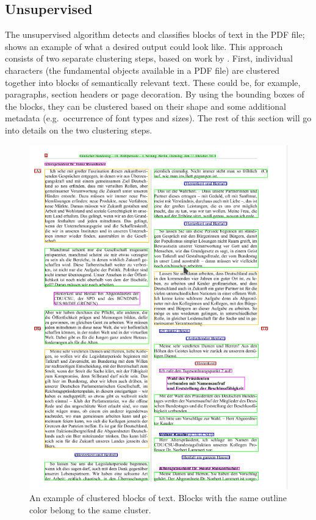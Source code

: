 \subsection{Unsupervised}%
\label{sec:unsup}
The unsupervised algorithm detects and classifies blocks of text in the PDF
file;  shows an example of what a desired output could
look like. This approach consists of two separate clustering steps, based on
work by \textcite{klampfl2014unsupervised}. First, individual characters (the
fundamental objects available in a PDF file) are clustered together into
blocks of semantically relevant text. These could be, for example,
paragraphs, section headers or page decoration. By using the bounding boxes of
the blocks, they can be clustered based on their shape and some additional
metadata (e.g.\ occurrence of font types and sizes). The rest of this section
will go into details on the two clustering steps.

\begin{figure}[tb]
  \centering
  \includegraphics[height=0.5\textheight]{figures/cluster_example.png}
  \caption{An example of clustered blocks of text. Blocks with the same outline
  color belong to the same cluster.\label{fig:clustered}}
\end{figure}

